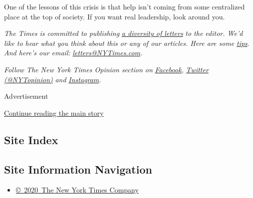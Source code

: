 One of the lessons of this crisis is that help isn't coming from some
centralized place at the top of society. If you want real leadership,
look around you.

\emph{The Times is committed to publishing}
\href{https://www.nytimes3xbfgragh.onion/2019/01/31/opinion/letters/letters-to-editor-new-york-times-women.html}{\emph{a
diversity of letters}} \emph{to the editor. We'd like to hear what you
think about this or any of our articles. Here are some}
\href{https://help.nytimes3xbfgragh.onion/hc/en-us/articles/115014925288-How-to-submit-a-letter-to-the-editor}{\emph{tips}}\emph{.
And here's our email:}
\href{mailto:letters@NYTimes.com}{\emph{letters@NYTimes.com}}\emph{.}

\emph{Follow The New York Times Opinion section on}
\href{https://www.facebookcorewwwi.onion/nytopinion}{\emph{Facebook}}\emph{,}
\href{http://twitter.com/NYTOpinion}{\emph{Twitter (@NYTopinion)}}
\emph{and}
\href{https://www.instagram.com/nytopinion/}{\emph{Instagram}}\emph{.}

Advertisement

\protect\hyperlink{after-bottom}{Continue reading the main story}

\hypertarget{site-index}{%
\subsection{Site Index}\label{site-index}}

\hypertarget{site-information-navigation}{%
\subsection{Site Information
Navigation}\label{site-information-navigation}}

\begin{itemize}
\tightlist
\item
  \href{https://help.nytimes3xbfgragh.onion/hc/en-us/articles/115014792127-Copyright-notice}{©~2020~The
  New York Times Company}
\end{itemize}

